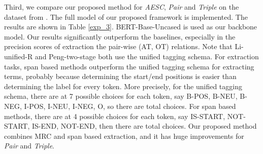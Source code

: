 \documentclass[letterpaper]{article} \usepackage{aaai21}  \usepackage{times}  \usepackage{helvet} \usepackage{courier}  \usepackage[hyphens]{url}  \usepackage{graphicx} \urlstyle{rm} \def\UrlFont{\rm}  \usepackage{natbib}  \usepackage{caption}
\begin{document}
Third, we compare our proposed method for \emph{AESC}, \emph{Pair} and \emph{Triple} on the dataset from \cite{peng2020knowing}. 
The full model of our proposed framework is implemented.  The results are shown in Table \ref{exp_3}. 
BERT-Base-Uncased is used as our backbone model. 
Our results significantly outperform the baselines, especially in the precision scores of extraction the pair-wise (AT, OT) relations. 
Note that Li-unified-R and Peng-two-stage both use the unified tagging schema. For extraction tasks, span based methods outperform the unified tagging schema for extracting terms, probably because determining the start/end positions is easier than determining the label for every token. 
More precisely, for the unified tagging schema, there are at 7 possible choices for each token, say B-POS, B-NEU, B-NEG, I-POS, I-NEU, I-NEG, O, so there are  total choices. 
For span based methods, there are at 4 possible choices for each token, say IS-START, NOT-START, IS-END, NOT-END, then there are  total choices. 
Our proposed method combines MRC and span based extraction, and it has huge improvements for \emph{Pair} and \emph{Triple}. 
\end{document}
